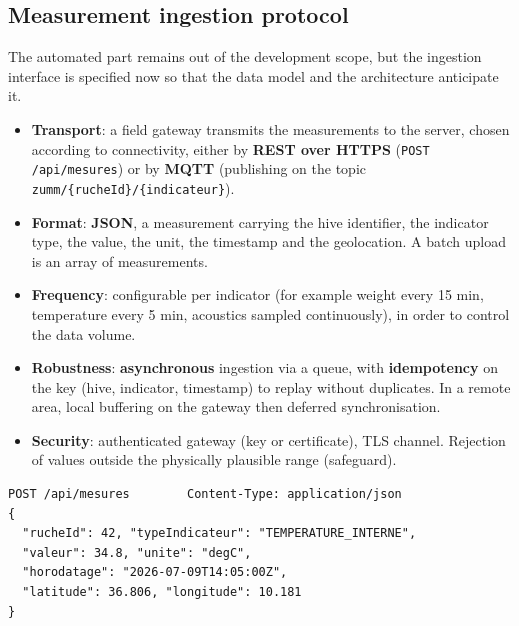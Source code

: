 \subsection{Measurement ingestion protocol}
The automated part remains out of the development scope, but the ingestion
interface is specified now so that the data model and the architecture
anticipate it.
\begin{itemize}
  \item \textbf{Transport}: a field gateway transmits the measurements to the
        server, chosen according to connectivity, either by \textbf{REST over
        HTTPS} (\texttt{POST /api/mesures}) or by \textbf{MQTT} (publishing on
        the topic \texttt{zumm/\{rucheId\}/\{indicateur\}}).
  \item \textbf{Format}: \textbf{JSON}, a measurement carrying the hive
        identifier, the indicator type, the value, the unit, the timestamp and
        the geolocation. A batch upload is an array of measurements.
  \item \textbf{Frequency}: configurable per indicator (for example weight
        every 15 min, temperature every 5 min, acoustics sampled
        continuously), in order to control the data volume.
  \item \textbf{Robustness}: \textbf{asynchronous} ingestion via a queue, with
        \textbf{idempotency} on the key (hive, indicator, timestamp) to replay
        without duplicates. In a remote area, local buffering on the gateway
        then deferred synchronisation.
  \item \textbf{Security}: authenticated gateway (key or certificate), TLS
        channel. Rejection of values outside the physically plausible range
        (safeguard).
\end{itemize}
\begin{verbatim}
POST /api/mesures        Content-Type: application/json
{
  "rucheId": 42, "typeIndicateur": "TEMPERATURE_INTERNE",
  "valeur": 34.8, "unite": "degC",
  "horodatage": "2026-07-09T14:05:00Z",
  "latitude": 36.806, "longitude": 10.181
}
\end{verbatim}

